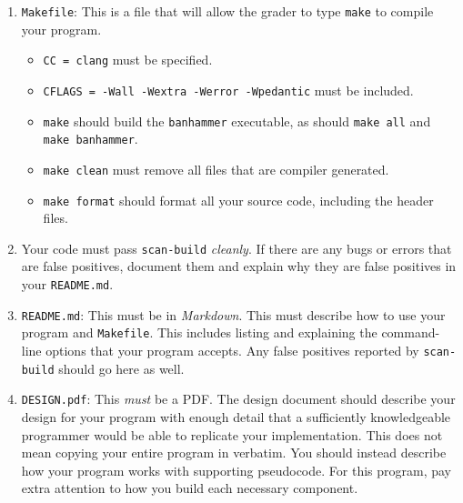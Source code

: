 \begin{enumerate}
  \item \texttt{Makefile}: This is a file that will allow the grader to
    type \texttt{make} to compile your program.

    \begin{itemize}
      \item \texttt{CC = clang} must be specified.
      \item \texttt{CFLAGS = -Wall -Wextra -Werror -Wpedantic}
        must be included.
      \item \texttt{make} should build the \texttt{banhammer}
        executable, as should \texttt{make all} and \texttt{make
        banhammer}.
      \item \texttt{make clean} must remove all files that are compiler
        generated.
      \item \texttt{make format} should format all your source code,
        including the header files.
    \end{itemize}

  \item Your code must pass \texttt{scan-build} \emph{cleanly}. If there
    are any bugs or errors that are false positives, document them and
    explain why they are false positives in your \texttt{README.md}.

  \item \texttt{README.md}: This must be in \emph{Markdown}. This must
    describe how to use your program and \texttt{Makefile}. This
    includes listing and explaining the command-line options that your
    program accepts. Any false positives reported by \texttt{scan-build}
    should go here as well.

  \item \texttt{DESIGN.pdf}: This \emph{must} be a PDF. The design
    document should describe your design for your program with enough
    detail that a sufficiently knowledgeable programmer would be able to
    replicate your implementation. This does not mean copying your
    entire program in verbatim. You should instead describe how your
    program works with supporting pseudocode. For this program, pay
    extra attention to how you build each necessary component.


\end{enumerate}

